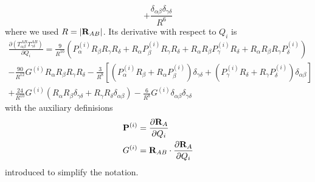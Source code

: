 \documentclass[a4paper,titlepage,twoside,fleqn,12pt]{book}
\newcommand{\fderiv}[2]{\ensuremath{
\frac{\partial #1}{\partial #2}}}
\begin{document}
\begin{refsection}
\begin{equation}
 + \frac{\delta_{\alpha\beta}\delta_{\gamma\delta}}{R^6}
\end{equation}
%
where we used $R=\left|{\bf R}_{AB}\right|$.
Its derivative with respect to $Q_i$ is
%
\begin{multline} \label{e:happylabel}
 \fderiv{\left( T^{AB}_{\alpha\beta} T^{AB}_{\gamma\delta} \right)}{Q_i} = 
  \frac{9}{R^{10}} 
   \left( 
     P^{(i)}_\alpha R_\beta R_\gamma R_\delta + 
     R_\alpha P^{(i)}_\beta R_\gamma R_\delta +
     R_\alpha R_\beta P^{(i)}_\gamma R_\delta +
     R_\alpha R_\beta R_\gamma P^{(i)}_\delta
   \right) \\
    - \frac{90}{R^{12}}
       G^{(i)} R_\alpha R_\beta R_\gamma R_\delta
    - \frac{3}{R^8} 
      \left[ 
          \left( P^{(i)}_\alpha R_\beta  + R_\alpha P^{(i)}_\beta \right)\delta_{\gamma\delta}
        + \left( P^{(i)}_\gamma R_\delta + R_\gamma P^{(i)}_\delta\right)\delta_{\alpha\beta}
      \right] \\
   + \frac{24}{R^{10}} G^{(i)} 
      \left( 
       R_\alpha R_\beta  \delta_{\gamma\delta} 
     + R_\gamma R_\delta \delta_{\alpha\beta} 
      \right) 
   - \frac{6}{R^{8}} G^{(i)} \delta_{\alpha\beta}  \delta_{\gamma\delta}
\end{multline}
%
with the auxiliary definisions
%
\begin{subequations} 
 \begin{align}
   {\bf P}^{(i)} &= \fderiv{{\bf R}_A}{Q_i}                    \label{e:pi} \\
   G^{(i)}       &= {\bf R}_{AB} \cdot \fderiv{{\bf R}_A}{Q_i} \label{e:gi}
 \end{align}
\end{subequations}
%
introduced to simplify the notation.


\end{refsection}
\end{document}
